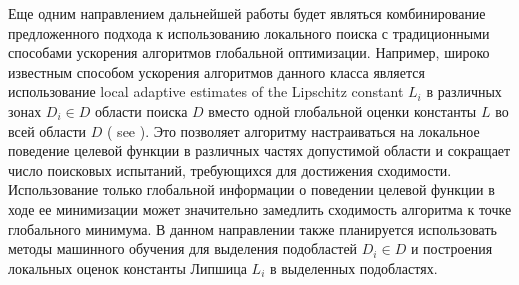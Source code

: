 \documentclass[entropy,article,submit,moreauthors,pdftex]{Definitions/mdpi}
\begin{document}
Еще одним направлением дальнейшей работы будет являться комбинирование предложенного подхода к использованию локального поиска с традиционными способами ускорения алгоритмов глобальной оптимизации. Например, широко известным способом ускорения алгоритмов данного класса является использование local adaptive estimates of the Lipschitz constant $L_i$ в различных зонах $D_i \in D$ области поиска $D$ вместо одной глобальной оценки константы $L$ во всей области $D$ ( see \cite{Kvasov2020,Sergeyev2021}).
Это позволяет алгоритму настраиваться на локальное поведение целевой функции в различных частях допустимой области и сокращает число поисковых испытаний, требующихся для достижения сходимости. Использование только глобальной информации о поведении целевой функции в ходе ее минимизации может значительно замедлить сходимость алгоритма к точке
глобального минимума. В данном направлении также планируется использовать методы машинного обучения для выделения подобластей $D_i \in D$ и построения локальных оценок константы Липшица $L_i$ в выделенных подобластях. 





\vspace{6pt} 



\end{document}
